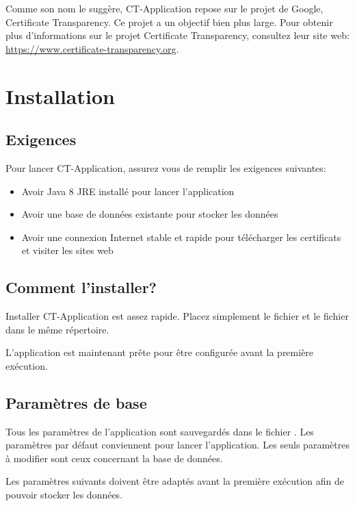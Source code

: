 \documentclass{article}
\begin{document}
Comme son nom le suggère, CT-Application repose sur le projet de Google, Certificate Transparency.  Ce projet a un objectif bien plus large.  Pour obtenir plus d'informations sur le projet Certificate Transparency, consultez leur site web: \url{https://www.certificate-transparency.org}.


\section{Installation}


\subsection{Exigences}

Pour lancer CT-Application, assurez vous de remplir les exigences suivantes:

\begin{itemize}
\item Avoir Java 8 JRE installé pour lancer l'application
\item Avoir une base de données existante pour stocker les données
\item Avoir une connexion Internet stable et rapide pour télécharger les certificats et visiter les sites web 
\end{itemize}


\subsection{Comment l'installer?}

Installer CT-Application est assez rapide.  Placez simplement le fichier  et le fichier  dans le même répertoire.

L'application est maintenant prête pour être configurée avant la première exécution.

\subsection{Paramètres de base}

Tous les paramètres de l'application sont sauvegardés dans le fichier .  Les paramètres par défaut conviennent pour lancer l'application.  Les seuls paramètres à modifier sont ceux concernant la base de données.

Les paramètres suivants doivent être adaptés avant la première exécution afin de pouvoir stocker les données.
\end{document}
